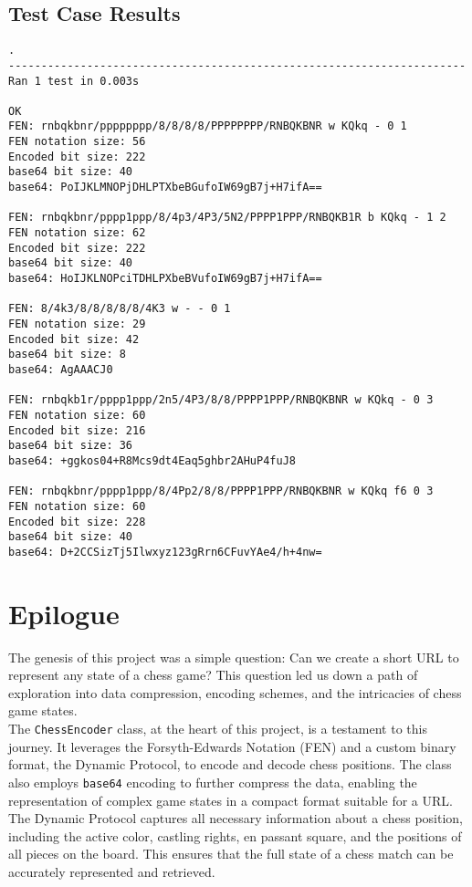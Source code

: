 \documentclass{article}
\begin{document}
\subsection{Test Case Results}
\begin{verbatim}
.
----------------------------------------------------------------------
Ran 1 test in 0.003s

OK
FEN: rnbqkbnr/pppppppp/8/8/8/8/PPPPPPPP/RNBQKBNR w KQkq - 0 1
FEN notation size: 56
Encoded bit size: 222
base64 bit size: 40
base64: PoIJKLMNOPjDHLPTXbeBGufoIW69gB7j+H7ifA==

FEN: rnbqkbnr/pppp1ppp/8/4p3/4P3/5N2/PPPP1PPP/RNBQKB1R b KQkq - 1 2
FEN notation size: 62
Encoded bit size: 222
base64 bit size: 40
base64: HoIJKLNOPciTDHLPXbeBVufoIW69gB7j+H7ifA==

FEN: 8/4k3/8/8/8/8/8/4K3 w - - 0 1
FEN notation size: 29
Encoded bit size: 42
base64 bit size: 8
base64: AgAAACJ0

FEN: rnbqkb1r/pppp1ppp/2n5/4P3/8/8/PPPP1PPP/RNBQKBNR w KQkq - 0 3
FEN notation size: 60
Encoded bit size: 216
base64 bit size: 36
base64: +ggkos04+R8Mcs9dt4Eaq5ghbr2AHuP4fuJ8

FEN: rnbqkbnr/pppp1ppp/8/4Pp2/8/8/PPPP1PPP/RNBQKBNR w KQkq f6 0 3
FEN notation size: 60
Encoded bit size: 228
base64 bit size: 40
base64: D+2CCSizTj5Ilwxyz123gRrn6CFuvYAe4/h+4nw=

\end{verbatim}  

\newpage

\section{Epilogue}

The genesis of this project was a simple question: Can we create a short URL to represent any state of a chess game? This question led us down a path of exploration into data compression, encoding schemes, and the intricacies of chess game states. \\

The \verb|ChessEncoder| class, at the heart of this project, is a testament to this journey. It leverages the Forsyth-Edwards Notation (FEN) and a custom binary format, the Dynamic Protocol, to encode and decode chess positions. The class also employs \verb|base64| encoding to further compress the data, enabling the representation of complex game states in a compact format suitable for a URL. \\

The Dynamic Protocol captures all necessary information about a chess position, including the active color, castling rights, en passant square, and the positions of all pieces on the board. This ensures that the full state of a chess match can be accurately represented and retrieved.
\end{document}
